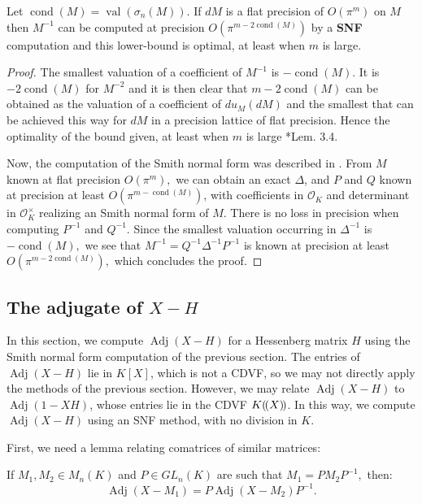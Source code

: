 \documentclass{sig-alternate-05-2015}
\DeclareMathOperator{\val}{val}
\DeclareMathOperator{\adj}{Adj}
\DeclareMathOperator{\cond}{cond}
\newcommand{\OK}{\mathcal{O}_K}
\newcommand{\llp}{(\mkern-2.5mu(}
\newcommand{\rrp}{)\mkern-2.5mu)}
\begin{document}
\begin{prop}
Let $\cond(M) = \val(\sigma_n(M))$.
If $dM$ is a flat precision of $O(\pi^m)$ on $M$ then $M^{-1}$
can be computed at precision $O(\pi^{m-2\cond(M)})$ by a \textbf{SNF} computation
and this lower-bound is optimal,
at least when $m$ is large.
\end{prop}
\begin{proof}
The smallest valuation of a coefficient of $M^{-1}$ is $-\cond(M).$
It is $-2\cond(M)$ for $M^{-2}$ and it is then clear that $m-2\cond(M)$
can be obtained as the valuation of a coefficient of $du_M(dM)$
and the smallest that can be achieved this way for $dM$ in a precision lattice
of flat precision. Hence the optimality of the bound given, at least when 
$m$ is large \cite{caruso-roe-vaccon:14a}*{Lem. 3.4}.

Now, the computation of the Smith normal form was described in \cite{Vaccon-these}.
From $M$ known at flat precision $O(\pi^m),$ we can obtain an exact $\Delta$, and $P$ and $Q$ 
known at precision at least $O(\pi^{m-\cond(M)})$, with coefficients in $\OK$
and determinant in $\OK^\times$ realizing an Smith normal form of $M.$
There is no loss in precision when computing $P^{-1}$ and $Q^{-1}.$
Since the smallest valuation occurring in $\Delta^{-1}$ is $-\cond(M),$
we see that $M^{-1}=Q^{-1} \Delta^{-1} P^{-1}$ is known at precision at least $O(\pi^{m-2\cond(M)}),$
which concludes the proof.
\end{proof}

\subsection{The adjugate of $X{-}H$}

In this section, we compute $\adj(X-H)$ for a Hessenberg matrix $H$
using the Smith normal form computation of the previous section.
The entries of $\adj(X-H)$ lie in $K[X]$, which is not a CDVF,
so we may not directly apply the methods of the previous section.
However, we may relate $\adj(X-H)$ to $\adj(1-XH)$, whose
entries lie in the CDVF $K\llp X\rrp$.  In this way, we compute $\adj(X-H)$
using an SNF method, with no division in $K$.

First, we need a lemma relating comatrices of
similar matrices:

\begin{lem} \label{lem:adjugate_of_similar}
If $M_1,M_2 \in M_n(K)$ and $P \in GL_n (K)$ are such that
$M_1=PM_2P^{-1},$ then:
\[ \adj (X-M_1)=P \adj (X-M_2) P^{-1}. \] 
\end{lem}
\end{document}

